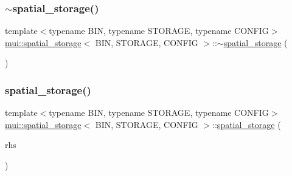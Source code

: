 \subsubsection{\texorpdfstring{$\sim$spatial\+\_\+storage()}{~spatial\_storage()}}
{\footnotesize\ttfamily template$<$typename B\+IN, typename S\+T\+O\+R\+A\+GE, typename C\+O\+N\+F\+IG$>$ \\
\hyperlink{classmui_1_1spatial__storage}{mui\+::spatial\+\_\+storage}$<$ B\+IN, S\+T\+O\+R\+A\+GE, C\+O\+N\+F\+IG $>$\+::$\sim$\hyperlink{classmui_1_1spatial__storage}{spatial\+\_\+storage} (\begin{DoxyParamCaption}{ }\end{DoxyParamCaption})\hspace{0.3cm}{\ttfamily [inline]}}

\mbox{\label{classmui_1_1spatial__storage_a821dd78256426103090a45f769b9903f}} 
\subsubsection{\texorpdfstring{spatial\+\_\+storage()}{spatial\_storage()}\hspace{0.1cm}{\footnotesize\ttfamily [2/4]}}
{\footnotesize\ttfamily template$<$typename B\+IN, typename S\+T\+O\+R\+A\+GE, typename C\+O\+N\+F\+IG$>$ \\
\hyperlink{classmui_1_1spatial__storage}{mui\+::spatial\+\_\+storage}$<$ B\+IN, S\+T\+O\+R\+A\+GE, C\+O\+N\+F\+IG $>$\+::\hyperlink{classmui_1_1spatial__storage}{spatial\+\_\+storage} (\begin{DoxyParamCaption}\item[{const \hyperlink{classmui_1_1spatial__storage}{spatial\+\_\+storage}$<$ B\+IN, S\+T\+O\+R\+A\+GE, C\+O\+N\+F\+IG $>$ \&}]{rhs }\end{DoxyParamCaption})\hspace{0.3cm}{\ttfamily [inline]}}

\mbox{\label{classmui_1_1spatial__storage_a9d2d9d0b277a0d72b56b2af35787d74b}} 

